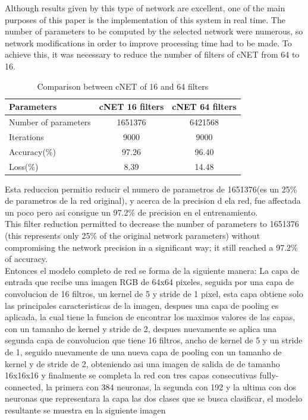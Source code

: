 \documentclass[conference]{IEEEtran}
\begin{document}
Although results given by this type of network are excellent, one of the main purposes of this paper is the implementation of this system in real time. The number of parameters to be computed by the selected network were numerous, so network modifications in order to improve processing time had to be made. To achieve this, it was necessary to reduce the number of filters of cNET from 64 to 16.\\

\begin{table}[h!]
\centering
\begin{tabular}{|l c c |} 
 \hline
 \textbf{Parameters} & \textbf{cNET 16 filters} & \textbf{cNET 64 filters} \\ [0.75ex] 
 \hline
 Number of parameters & 1651376 & 6421568 \\ 
 Iterations & 9000 & 9000  \\ 
  Accuracy(\%) & 97.26 & 96.40  \\
  Loss(\%) & 8.39 & 14.48  \\ [1ex] 
 \hline 
\end{tabular}
\caption{Comparison between cNET of 16 and 64 filters}
\label{table:3}
\end{table}

Esta reduccion permitio reducir el numero de parametros de 1651376(es un 25\% de parametros de la red original), y acerca de la precision d ela red, fue affectada un poco pero asi consigue un 97.2\% de precision en el entrenamiento.  \\

This filter reduction permitted to decrease the number of parameters to 1651376 (this represents only 25\% of the original network parameters) without compromising the network precision in a significant way; it still reached a 97.2\% of accuracy.\\

Entonces el modelo completo de red se forma de la siguiente manera: La capa de entrada que recibe una imagen RGB de 64x64 pixeles, seguida por una capa de convolucion de 16 filtros, un kernel de 5 y stride de 1 pixel, esta capa obtiene solo las principales caracteristicas de la imagen, despues una capa de pooling es aplicada, la cual tiene la funcion de encontrar los maximos valores de las capas, con un tamanho de kernel y stride de 2, despues nuevamente se aplica una segunda capa de convolucion que tiene 16 filtros, ancho de kernel de 5 y un stride de 1, seguido nuevamente de una nueva  capa de pooling con un tamanho de kernel y de stride de 2, obteniendo asi una imagen de salida de de tamanho 16x16x16 y finalmente se completa la red con tres capas consecutivas fully-connected, la primera con 384 neuronas, la segunda con 192 y la ultima con dos neuronas que representara la capa las dos clases que se busca  clasificar, el modelo resultante se muestra en la siguiente imagen \\
\end{document}
